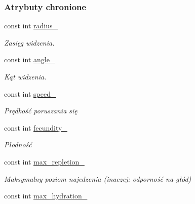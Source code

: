 \subsubsection*{Atrybuty chronione}
\begin{DoxyCompactItemize}
\item 
\hypertarget{classCreature_a319be828285119ac6d619bf1f926ada5}{const int \hyperlink{classCreature_a319be828285119ac6d619bf1f926ada5}{radius\-\_\-}}\label{classCreature_a319be828285119ac6d619bf1f926ada5}

\begin{DoxyCompactList}\small\item\em Zasięg widzenia. \end{DoxyCompactList}\item 
\hypertarget{classCreature_afa39083bf461c18b35a4c0deac5c68f1}{const int \hyperlink{classCreature_afa39083bf461c18b35a4c0deac5c68f1}{angle\-\_\-}}\label{classCreature_afa39083bf461c18b35a4c0deac5c68f1}

\begin{DoxyCompactList}\small\item\em Kąt widzenia. \end{DoxyCompactList}\item 
\hypertarget{classCreature_ae473a3d0259ba0da2516b8500009283a}{const int \hyperlink{classCreature_ae473a3d0259ba0da2516b8500009283a}{speed\-\_\-}}\label{classCreature_ae473a3d0259ba0da2516b8500009283a}

\begin{DoxyCompactList}\small\item\em Prędkość poruszania się \end{DoxyCompactList}\item 
\hypertarget{classCreature_a44c060eec028a0802ef4a0126139192b}{const int \hyperlink{classCreature_a44c060eec028a0802ef4a0126139192b}{fecundity\-\_\-}}\label{classCreature_a44c060eec028a0802ef4a0126139192b}

\begin{DoxyCompactList}\small\item\em Płodność \end{DoxyCompactList}\item 
\hypertarget{classCreature_ad7ac348b54af3efd118ef36b6c753962}{const int \hyperlink{classCreature_ad7ac348b54af3efd118ef36b6c753962}{max\-\_\-repletion\-\_\-}}\label{classCreature_ad7ac348b54af3efd118ef36b6c753962}

\begin{DoxyCompactList}\small\item\em Maksymalny poziom najedzenia (inaczej\-: odporność na głód) \end{DoxyCompactList}\item 
\hypertarget{classCreature_aaee7a3d9488cdeda758315440af15f30}{const int \hyperlink{classCreature_aaee7a3d9488cdeda758315440af15f30}{max\-\_\-hydration\-\_\-}}\label{classCreature_aaee7a3d9488cdeda758315440af15f30}


\end{DoxyCompactItemize}
